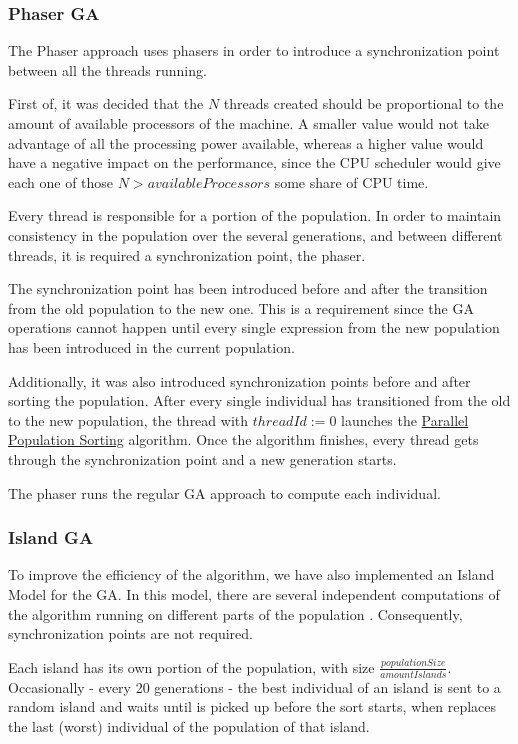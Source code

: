 \documentclass[runningheads]{llncs}
\begin{document}
\subsubsection{Phaser GA} \hfill \par

The Phaser approach uses phasers in order to introduce a synchronization point between all the threads running.

First of, it was decided that the \(N\) threads created should be proportional to the amount of available processors of the machine. A smaller value would not take advantage of all the processing power available, whereas a higher value would have a negative impact on the performance, since the CPU scheduler would give each one of those \(N > availableProcessors\) some share of CPU time.

Every thread is responsible for a portion of the population. In order to maintain consistency in the population over the several generations, and between different threads, it is required a synchronization point, the phaser. 

The synchronization point has been introduced before and after the transition from the old population to the new one. This is a requirement since the GA operations cannot happen until every single expression from the new population has been introduced in the current population.

Additionally, it was also introduced synchronization points before and after sorting the population. After every single individual has transitioned from the old to the new population, the thread with \(threadId := 0\) launches the \hyperref[subsubsec:parallelSort]{Parallel Population Sorting} algorithm. Once the algorithm finishes, every thread gets through the synchronization point and a new generation starts.

The phaser runs the regular GA approach to compute each individual.

\subsubsection{Island GA} \hfill \par
To improve the efficiency of the algorithm, we have also implemented an Island Model for the GA. In this model, there are several independent computations of the algorithm running on different parts of the population \cite{islandModelGA}. Consequently, synchronization points are not required.

Each island has its own portion of the population, with size  $\frac{populationSize}{amountIslands}$. Occasionally - every 20 generations - the best individual of an island is sent to a random island and waits until is picked up before the sort starts, when replaces the last (worst) individual of the population of that island.
\end{document}
